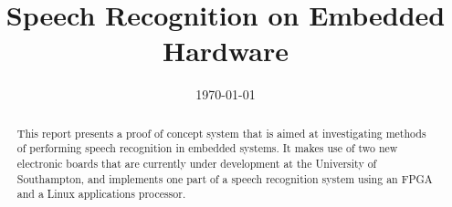 \documentclass{ecsreport}     			%
\begin{document}
\frontmatter
\title      {Speech Recognition on Embedded Hardware}
\addresses  {\groupname\\\deptname\\\univname}
\date       {\today}
\subject    {}
\keywords   {}
\maketitle
\begin{abstract}  %
This report presents a proof of concept system that is aimed at investigating methods of performing speech recognition in embedded systems.  It makes use of two new electronic boards that are currently under development at the University of Southampton, and implements one part of a speech recognition system using an FPGA and a Linux applications processor.
\end{abstract}
\tableofcontents
\mainmatter









%
\backmatter

\end{document}
